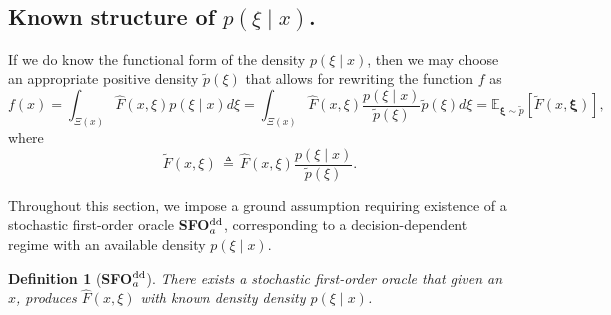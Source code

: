 \documentclass[11pt,reqno]{amsart}
\newcommand{\1}{{\bf 1}}
\newcommand{\2}{{\bf 2}}
\newcommand{\mr}[1]{{\color{blue}#1}}
\newcommand{\bxi}{\boldsymbol{\xi}}
\numberwithin{equation}{section}
\newtheorem{definition}{Definition}[section]
\theoremstyle{remark}
\newcommand{\beq}{\begin{equation}}
\newcommand{\eeq}{\end{equation}}
\begin{document}
{			\subsection{Known structure of $p(\xi \mid x)$.}\label{sub:p_known}
			If we do know the {functional form of the} density $p(\xi \mid x)$, then we may choose an appropriate positive density $\tilde{p}(\xi)$  that allows for rewriting the function $f$ as
			\begin{equation}\label{eq:dectonondec}
				f(x)=\int_{\Xi(x)} \hat{F}(x, \xi)p(\xi \mid  x) d\xi=\int_{\Xi(x)} \hat{F}(x, \xi)\frac{p(\xi \mid  x)}{\tilde{p}(\xi)}\tilde{p}(\xi) d\xi=\mathbb{E}_{\bxi \sim \tilde{p}}\left[\tilde{F}(x,\bxi)\right],
			\end{equation}
			where
			\beq\label{eq:tilde-F} 
			\tilde{F}(x,\xi) \, \triangleq \, \hat{F}(x,
			\xi)\frac{p(\xi \mid  x)}{\tilde{p}(\xi)}.
			\eeq
			
			{Throughout} this section, {we impose a ground assumption requiring} existence of a stochastic first-order oracle {\bf SFO$^{\rm dd}_a$}, corresponding to a decision-dependent regime with  an available density $p(\xi\mid x)$.\\
			
			\begin{definition}[{\bf SFO$^{\rm dd}_a$}]  \label{sfo-dda} There exists a stochastic first-order oracle that given an $x$, produces $\hat{F}(x,\xi)$  with known density density $p(\xi\mid x)$.  
			\end{definition}
			
			\medskip
			
}
\end{document}
